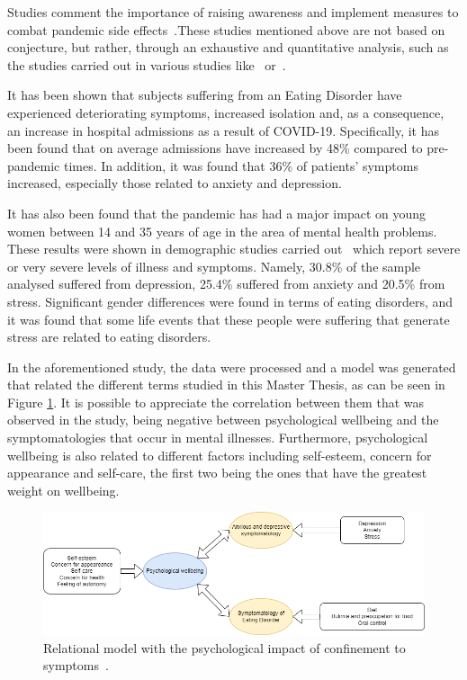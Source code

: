 
Studies comment the importance of raising awareness and implement measures to combat pandemic side effects~\cite{touyz2020eating}.These studies mentioned above are not based on conjecture, but rather, through an exhaustive and quantitative analysis, such as the studies carried out in various studies like~\cite{j2022impact} or~\cite{vall2021impacto}. 

It has been shown that subjects suffering from an Eating Disorder have experienced deteriorating symptoms, increased isolation and, as a consequence, an increase in hospital admissions as a result of COVID-19. Specifically, it has been found that on average admissions have increased by 48\% compared to pre-pandemic times. In addition, it was found that 36\% of patients' symptoms increased, especially those related to anxiety and depression.

It has also been found that the pandemic has had a major impact on young women between 14 and 35 years of age in the area of mental health problems. These results were shown in demographic studies carried out~\cite{vall2021impacto} which report severe or very severe levels of illness and symptoms. Namely, 30.8\% of the sample analysed suffered from depression, 25.4\% suffered from anxiety and 20.5\% from stress. Significant gender differences were found in terms of eating disorders, and it was found that some life events that these people were suffering that generate stress are related to eating disorders.

In the aforementioned study, the data were processed and a model was generated that related the different terms studied in this Master Thesis, as can be seen in Figure \ref{fig:vall_diagram}. It is possible to appreciate the correlation between them that was observed in the study, being negative between psychological wellbeing and the symptomatologies that occur in mental illnesses. Furthermore, psychological wellbeing is also related to different factors including self-esteem, concern for appearance and self-care, the first two being the ones that have the greatest weight on wellbeing.

\begin{figure}[!htp]
    \centering
    \includegraphics[scale=0.53]{img/introduction/vall_diagram.png}
    \caption{Relational model with the psychological impact of confinement to symptoms~\cite{vall2021impacto}.}
    \label{fig:vall_diagram}
\end{figure}


